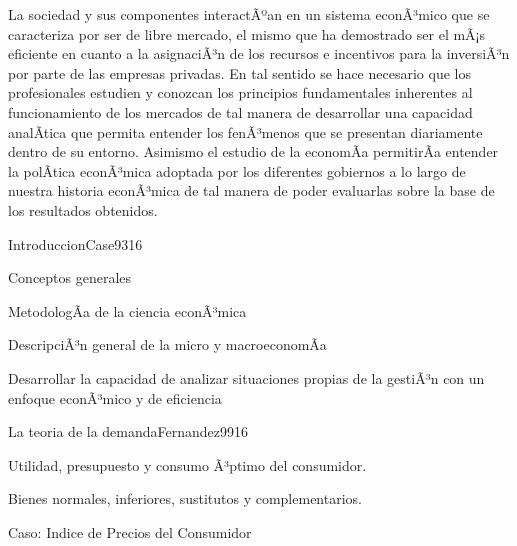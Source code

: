 \begin{syllabus}


\begin{justification}
La sociedad y sus componentes interactÃºan en un sistema econÃ³mico que se caracteriza por ser de libre mercado, el mismo que ha demostrado ser el mÃ¡s eficiente en cuanto a la asignaciÃ³n de los recursos e incentivos para la inversiÃ³n por parte de las empresas privadas. En tal sentido se hace necesario que los profesionales estudien y conozcan los principios fundamentales inherentes al funcionamiento de los mercados de tal manera de desarrollar una capacidad analÃ­tica que permita entender los fenÃ³menos que se presentan diariamente dentro de su entorno. Asimismo el estudio de la economÃ­a permitirÃ­a entender la polÃ­tica econÃ³mica adoptada por los diferentes gobiernos a lo largo de nuestra historia econÃ³mica de tal manera de poder evaluarlas sobre la base de los resultados obtenidos.
\end{justification}

\begin{goals}
\item \OutcomeHU
\end{goals}

\begin{outcomes}
\end{outcomes}

\begin{unit}{Introduccion}{Case93}{16}
\begin{topics}
	\item Conceptos generales
	\item MetodologÃ­a de la ciencia econÃ³mica
	\item DescripciÃ³n general de la micro y macroeconomÃ­a
\end{topics}

\begin{unitgoals}
      \item Desarrollar la capacidad de analizar situaciones propias de la gestiÃ³n con un enfoque econÃ³mico y de eficiencia
   \end{unitgoals}
\end{unit}

\begin{unit}{La teoria de la demanda}{Fernandez99}{16}
\begin{topics}
	\item  Utilidad, presupuesto y consumo Ã³ptimo del consumidor.
	\item Bienes normales, inferiores, sustitutos y complementarios.
 	\item Caso: Indice de Precios del Consumidor
\end{topics}


\end{unit}
\end{syllabus}
